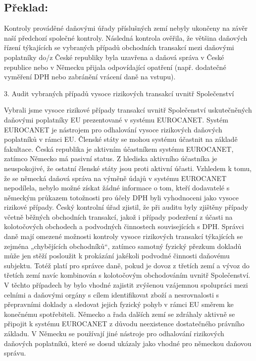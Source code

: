 \documentclass[10pt]{article}
\begin{document}
\pagebreak

\subsection*{Překlad:}

Kontroly prováděné daňovými úřady příslušných zemí nebyly ukončeny na závěr naší předchozí společné kontroly.
Následná kontrola ověřila, že většina daňových řízení týkajících se vybraných případů obchodních transakcí mezi daňovými poplatníky do/z České republiky byla uzavřena a daňová správa v České republice nebo v Německu přijala odpovídající opatření (např. dodatečné vyměření DPH nebo zabránění vrácení daně na vstupu).


3. Audit vybraných případů vysoce rizikových transakcí uvnitř Společenství

Vybrali jsme vysoce rizikové případy transakcí uvnitř Společenství uskutečněných daňovými poplatníky EU prezentované v systému EUROCANET.
Systém EUROCANET je nástrojem pro odhalování vysoce rizikových daňových poplatníků v rámci EU.
Členské státy se mohou systému účastnit na základě fakultace.
Česká republika je aktivním účastníkem systému EUROCANET, zatímco Německo má pasivní status.
Z hlediska aktivního účastníka je neuspokojivé, že ostatní členské státy jsou proti aktivní účasti.
Vzhledem k tomu, že se německá daňová správa na výměně údajů v systému EUROCANET nepodílela, nebylo možné získat žádné informace o tom, kteří dodavatelé s německým průkazem totožnosti pro účely DPH byli vyhodnoceni jako vysoce rizikové případy.
Český kontrolní úřad zjistil, že při auditu byly zjištěny případy včetně běžných obchodních transakcí, jakož i případy podezření z účasti na kolotočových obchodech a podvodných činnostech souvisejících s DPH.
Správci daně mají omezené možnosti kontroly vysoce rizikových transakcí týkajících se zejména „chybějících obchodníků“, zatímco samotný fyzický přezkum dokladů může jen stěží posloužit k prokázání jakékoli podvodné činnosti daňovému subjektu.
Totéž platí pro správce daně, pokud je dovoz z třetích zemí a vývoz do třetích zemí navíc kombinován s kolotočovým obchodováním uvnitř Společenství.
V těchto případech by bylo vhodné zajistit zvýšenou vzájemnou spolupráci mezi celními a daňovými orgány s cílem identifikovat zboží a nesrovnalosti s přepravními doklady a sledovat jejich fyzický pohyb v rámci EU směrem ke konečnému spotřebiteli.
Německo a řada dalších zemí se zdráhaly aktivně se připojit k systému EUROCANET z důvodu neexistence dostatečného právního základu.
V Německu se používají jiné nástroje pro odhalování rizikových daňových poplatníků, které se dosud ukázaly jako vhodné pro německou daňovou správu.
\end{document}
